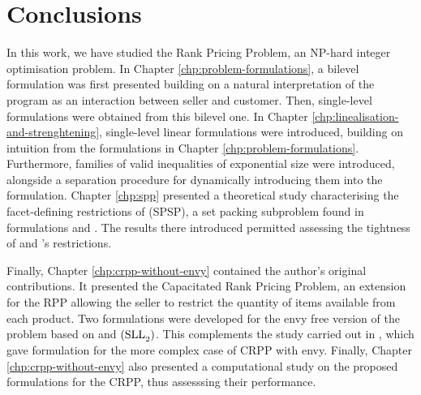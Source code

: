 \chapter{Conclusions}
\label{chp:conclusions}

In this work, we have studied the Rank Pricing Problem, an NP-hard integer
optimisation problem. In Chapter \ref{chp:problem-formulations}, a bilevel
formulation was first presented building on a natural interpretation of the
program as an interaction between seller and customer. Then, single-level
formulations were obtained from this bilevel one. In Chapter
\ref{chp:linealisation-and-strenghtening}, single-level linear formulations were
introduced, building on intuition from the formulations in Chapter
\ref{chp:problem-formulations}. Furthermore, families of valid inequalities of
exponential size were introduced, alongside a separation procedure for
dynamically introducing them into the formulation. Chapter \ref{chp:spp}
presented a theoretical study characterising the facet-defining restrictions of
(SPSP), a set packing subproblem found in formulations \slla and \sllb. The
results there introduced permitted assessing the tightness of \slla and \sllb's
restrictions.

Finally, Chapter \ref{chp:crpp-without-envy} contained the author's original
contributions. It presented the Capacitated Rank Pricing Problem, an extension
for the RPP allowing the seller to restrict the quantity of items available from
each product. Two formulations were developed for the envy free version of the
problem based on \slla and $\rm{(SLL}_2\rm{)}$. This complements the study
carried out in \cite{do:envy}, which gave formulation for the more complex case
of CRPP with envy. Finally, Chapter \ref{chp:crpp-without-envy} also presented a
computational study on the proposed formulations for the CRPP, thus assesssing
their performance.

